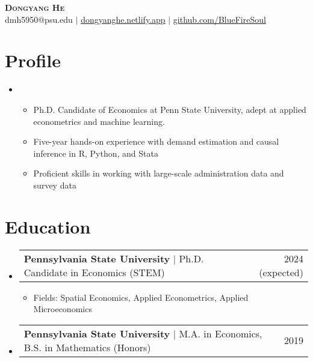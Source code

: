 \documentclass[letterpaper,10pt]{article}
\makeatletter
\newcommand{\resumeItem}[1]{
  \item\small{
    {#1 \vspace{-2pt}}
  }
}
\newcommand{\resumeSubSubheading}[2]{
    \item
    \begin{tabular*}{0.97\textwidth}{l@{\extracolsep{\fill}}r}
      \small#1 & \small #2 \\
    \end{tabular*}\vspace{-7pt}
}
\newcommand{\resumeSubHeadingListStart}{\begin{itemize}[leftmargin=0.15in, label={}]}
\newcommand{\resumeSubHeadingListEnd}{\end{itemize}}
\newcommand{\resumeItemListStart}{\begin{itemize}}
\newcommand{\resumeItemListEnd}{\end{itemize}\vspace{-5pt}}
\makeatother
\begin{document}

\begin{center}
    \textbf{\Huge \scshape Dongyang He} \\ \vspace{1pt}
    \small dmh5950@psu.edu $|$ \href{https://dongyanghe.netlify.app}{\underline{dongyanghe.netlify.app}} $|$ \href{https://github.com/BlueFireSoul}{\underline{github.com/BlueFireSoul}} 
\end{center}

\section{Profile} %


\begin{itemize}[leftmargin=0.15in, label={}]
  \item 
  \resumeItemListStart
  \itemsep 0em 
        \resumeItem{Ph.D. Candidate of Economics at Penn State University, adept at applied econometrics and machine learning.}
        \resumeItem{Five-year hands-on experience with demand estimation and causal inference in R, Python, and Stata}
        \resumeItem{Proficient skills in working with large-scale administration data and survey data}
      \resumeItemListEnd
\end{itemize}



\section{Education}
  \resumeSubHeadingListStart
    \resumeSubSubheading
      {\textbf{Pennsylvania State University} $|$ Ph.D. Candidate in Economics (STEM) }{2024 (expected)}
      \resumeItemListStart
        \resumeItem{Fields: Spatial Economics, Applied Econometrics, Applied Microeconomics}
      \resumeItemListEnd
    \resumeSubSubheading
      {\textbf{Pennsylvania State University} $|$ M.A. in Economics, B.S. in Mathematics (Honors)}{2019}
  \resumeSubHeadingListEnd
  
\end{document}
